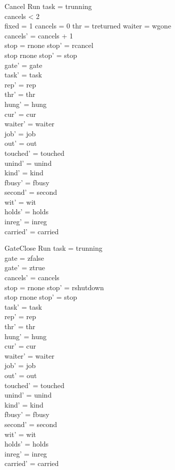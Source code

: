 \documentclass[a4paper,10pt,fleqn]{article}
\begin{document}
\begin{schema}{Cancel}
\Delta Run
\where
task = trunning \\
cancels < 2 \\
fixed = 1 \lor cancels = 0 \lor thr = treturned \lor waiter = wgone \\
cancels' = cancels + 1 \\
stop = rnone \implies stop' = rcancel \\
stop \neq rnone \implies stop' = stop \\
gate' = gate \\
task' = task \\
rep' = rep \\
thr' = thr \\
hung' = hung \\
cur' = cur \\
waiter' = waiter \\
job' = job \\
out' = out \\
touched' = touched \\
unind' = unind \\
kind' = kind \\
fbusy' = fbusy \\
second' = second \\
wit' = wit \\
holds' = holds \\
inreg' = inreg \\
carried' = carried
\end{schema}

\begin{schema}{GateClose}
\Delta Run
\where
task = trunning \\
gate = zfalse \\
gate' = ztrue \\
cancels' = cancels \\
stop = rnone \implies stop' = rshutdown \\
stop \neq rnone \implies stop' = stop \\
task' = task \\
rep' = rep \\
thr' = thr \\
hung' = hung \\
cur' = cur \\
waiter' = waiter \\
job' = job \\
out' = out \\
touched' = touched \\
unind' = unind \\
kind' = kind \\
fbusy' = fbusy \\
second' = second \\
wit' = wit \\
holds' = holds \\
inreg' = inreg \\
carried' = carried
\end{schema}
\end{document}
